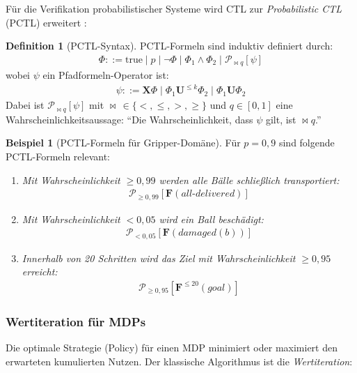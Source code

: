 ﻿\documentclass[a4paper,12pt]{article}
\theoremstyle{definition}
\newtheorem{definition}{Definition}[section]
\newtheorem{beispiel}{Beispiel}[section]
\begin{document}
Für die Verifikation probabilistischer Systeme wird CTL zur \emph{Probabilistic CTL} (PCTL) erweitert \cite{baier2008}:

\begin{definition}[PCTL-Syntax]
PCTL-Formeln sind induktiv definiert durch:
\begin{align}
  \Phi ::= \text{true} \mid p \mid \neg\Phi \mid \Phi_1 \land \Phi_2 \mid \mathcal{P}_{\bowtie q}[\psi]
\end{align}
wobei $\psi$ ein Pfadformeln-Operator ist:
\begin{align}
  \psi ::= \mathbf{X}\Phi \mid \Phi_1 \mathbf{U}^{\leq k} \Phi_2 \mid \Phi_1 \mathbf{U} \Phi_2
\end{align}
Dabei ist $\mathcal{P}_{\bowtie q}[\psi]$ mit $\bowtie\, \in \{<, \leq, >, \geq\}$ und $q \in [0,1]$ eine Wahrscheinlichkeitsaussage: ``Die Wahrscheinlichkeit, dass $\psi$ gilt, ist $\bowtie q$.''
\end{definition}

\begin{beispiel}[PCTL-Formeln für Gripper-Domäne]
Für $p = 0{,}9$ sind folgende PCTL-Formeln relevant:
\begin{enumerate}
  \item \textit{Mit Wahrscheinlichkeit $\geq 0{,}99$ werden alle Bälle schließlich transportiert:}
  \begin{align}
    \mathcal{P}_{\geq 0{,}99}[\mathbf{F}(\mathit{all\text{-}delivered})]
  \end{align}
  \item \textit{Mit Wahrscheinlichkeit $< 0{,}05$ wird ein Ball beschädigt:}
  \begin{align}
    \mathcal{P}_{< 0{,}05}[\mathbf{F}(\mathit{damaged}(b))]
  \end{align}
  \item \textit{Innerhalb von 20 Schritten wird das Ziel mit Wahrscheinlichkeit $\geq 0{,}95$ erreicht:}
  \begin{align}
    \mathcal{P}_{\geq 0{,}95}[\mathbf{F}^{\leq 20}(\mathit{goal})]
  \end{align}
\end{enumerate}
\end{beispiel}

\subsubsection{Wertiteration für MDPs}

Die optimale Strategie (Policy) für einen MDP minimiert oder maximiert den erwarteten kumulierten Nutzen. Der klassische Algorithmus ist die \emph{Wertiteration}:
\end{document}
